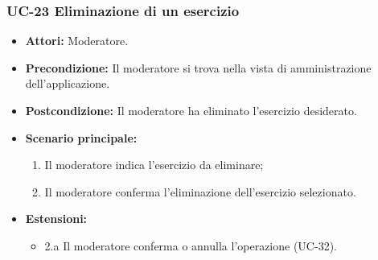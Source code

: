 	\subsubsection{UC-23 Eliminazione di un esercizio}
			\begin{itemize}
			\item \textbf{Attori:} Moderatore.
			\item \textbf{Precondizione:} Il moderatore si trova nella vista di amministrazione dell'applicazione.
			\item \textbf{Postcondizione:} Il moderatore ha eliminato l'esercizio desiderato.
			\item \textbf{Scenario principale:}
				\begin{enumerate}
					\item Il moderatore indica l'esercizio da eliminare;
					\item Il moderatore conferma l'eliminazione dell'esercizio selezionato.
				\end{enumerate}
			\item \textbf{Estensioni:}
			\begin{itemize}
			\item 2.a Il moderatore conferma o annulla l'operazione (UC-32).
			\end{itemize}
		\end{itemize}